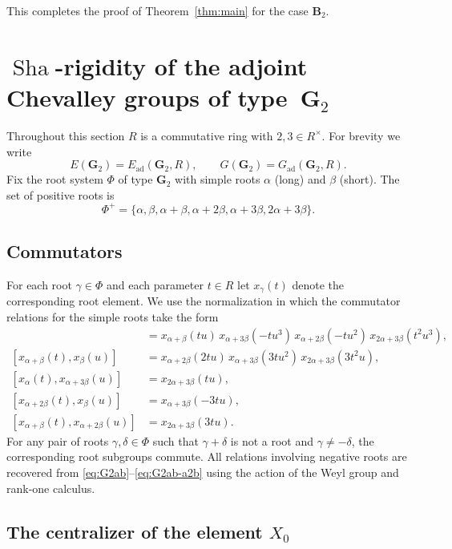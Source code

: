 \documentclass[]{jgcc}
\numberwithin{equation}{section}
\newcommand{\Sha}{\operatorname{Sha}}
\begin{document}
\medskip
This completes the proof of Theorem~\ref{thm:main} for the case $\mathbf B_2$.

\section{\texorpdfstring{$\Sha$-rigidity of the adjoint Chevalley groups of type~$\mathbf G_2$}{Sha-rigidity of the adjoint Chevalley groups of type G2}}\label{sec:G2}

Throughout this section $R$ is a commutative ring with $2,3\in R^\times$.
For brevity we write
\[
E(\mathbf G_2)=E_{\mathrm{ad}}(\mathbf G_2,R),\qquad G(\mathbf G_2)=G_{\mathrm{ad}}(\mathbf G_2,R).
\]
Fix the root system $\Phi$ of type $\mathbf G_2$ with simple roots
$\alpha$ (long) and $\beta$ (short).
The set of positive roots is
\[
\Phi^+=\{\alpha,\beta,\alpha+\beta,\alpha+2\beta,\alpha+3\beta,2\alpha+3\beta\}.
\]

\subsection{Commutators}
For each root $\gamma\in\Phi$ and each parameter $t\in R$ let
$x_\gamma(t)$ denote the corresponding root element.
We use the normalization in which the commutator relations for the simple roots take the form
\begin{align}
[x_\alpha(t),x_\beta(u)]
&= x_{\alpha+\beta}(tu)\,
   x_{\alpha+3\beta}(-tu^{3})\,
   x_{\alpha+2\beta}(-tu^{2})\,
   x_{2\alpha+3\beta}(t^{2}u^{3}), \label{eq:G2ab}\\
[x_{\alpha+\beta}(t),x_\beta(u)]
&= x_{\alpha+2\beta}(2tu)\,
   x_{\alpha+3\beta}(3tu^{2})\,
   x_{2\alpha+3\beta}(3t^{2}u), \label{eq:G2ab2}\\
[x_\alpha(t),x_{\alpha+3\beta}(u)]
&= x_{2\alpha+3\beta}(tu), \label{eq:G2a-a3b}\\
[x_{\alpha+2\beta}(t),x_\beta(u)]
&= x_{\alpha+3\beta}(-3tu), \label{eq:G2a2b-b}\\
[x_{\alpha+\beta}(t),x_{\alpha+2\beta}(u)]
&= x_{2\alpha+3\beta}(3tu). \label{eq:G2ab-a2b}
\end{align}
For any pair of roots $\gamma,\delta\in\Phi$ such that $\gamma+\delta$ is not a root and $\gamma\neq-\delta$,
the corresponding root subgroups commute.
All relations involving negative roots are recovered from \eqref{eq:G2ab}--\eqref{eq:G2ab-a2b} using the action of the Weyl group and rank-one calculus.

\subsection{\texorpdfstring{The centralizer of the element $X_0$}{The centralizer of the element X0}}
\end{document}
